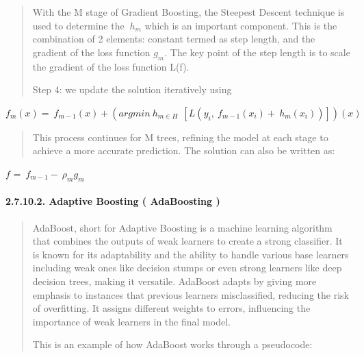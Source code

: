 \documentclass[
]{article}
\begin{document}
\begin{quote}
With the M stage of Gradient Boosting, the Steepest Descent technique is
used to determine the \(\ h_{m}\) which is an important component. This
is the combination of 2 elements: constant termed as step length, and
the gradient of the loss function \(g_{m}\). The key point of the step
length is to scale the gradient of the loss function L(f).

Step 4: we update the solution iteratively using
\end{quote}

\(f_{m}(x) = \ f_{m - 1}(x) + \left( argmin\ h_{m \in H}\ \ \left\lbrack L\left( y_{i},\ f_{m - 1}\left( x_{i} \right) + \ h_{m}\left( x_{i} \right) \right) \right\rbrack \right)(x)\)

\begin{quote}
This process continues for M trees, refining the model at each stage to
achieve a more accurate prediction. The solution can also be written as:
\end{quote}

\(f_{} = \ f_{m - 1} - \ \rho_{m}g_{m}\)

\hypertarget{adaptive-boosting-adaboosting}{%
\paragraph{\texorpdfstring{\textbf{2.7.10.2. Adaptive Boosting (
AdaBoosting )}
}{2.7.10.2. Adaptive Boosting ( AdaBoosting ) }}\label{adaptive-boosting-adaboosting}}

\begin{quote}
AdaBoost, short for Adaptive Boosting is a machine learning algorithm
that combines the outputs of weak learners to create a strong
classifier. It is known for its adaptability and the ability to handle
various base learners including weak ones like decision stumps or even
strong learners like deep decision trees, making it versatile. AdaBoost
adapts by giving more emphasis to instances that previous learners
misclassified, reducing the risk of overfitting. It assigns different
weights to errors, influencing the importance of weak learners in the
final model.

This is an example of how AdaBoost works through a pseudocode:
\end{quote}
\end{document}
